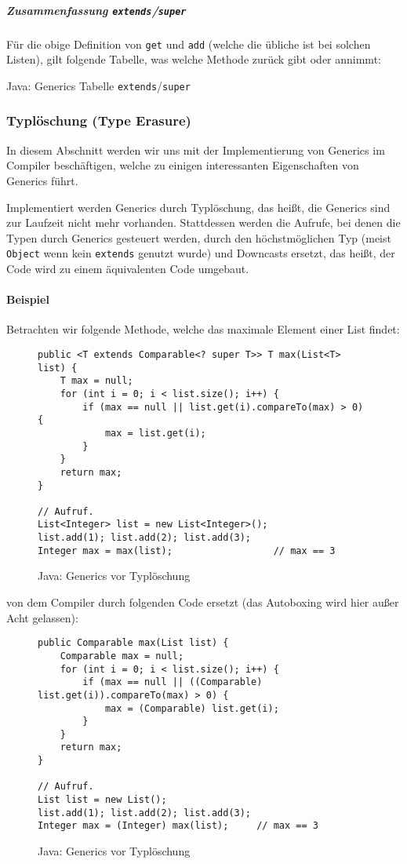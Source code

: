 			\subparagraph{Zusammenfassung \texttt{extends}/\texttt{super}}
				Für die obige Definition von \texttt{get} und \texttt{add} (welche die übliche ist bei solchen Listen), gilt folgende Tabelle, was welche Methode zurück gibt oder annimmt:
				\begin{table}[H]
					\centering
					\caption{Java: Generics Tabelle \texttt{extends}/\texttt{super}}
				\end{table}
	
	\subsubsection{Typlöschung (Type Erasure)}
		In diesem Abschnitt werden wir uns mit der Implementierung von Generics im Compiler beschäftigen, welche zu einigen interessanten Eigenschaften von Generics führt.
		
		Implementiert werden Generics durch Typlöschung, das heißt, die Generics sind zur Laufzeit nicht mehr vorhanden. Stattdessen werden die Aufrufe, bei denen die Typen durch Generics gesteuert werden, durch den höchstmöglichen Typ (meist \texttt{Object} wenn kein \texttt{extends} genutzt wurde) und Downcasts ersetzt, das heißt, der Code wird zu einem äquivalenten Code umgebaut.
		
		\paragraph{Beispiel}
			Betrachten wir folgende Methode, welche das maximale Element einer List findet:
			\begin{figure}[H]
				\centering
				\begin{lstlisting}
public <T extends Comparable<? super T>> T max(List<T> list) {
	T max = null;
	for (int i = 0; i < list.size(); i++) {
		if (max == null || list.get(i).compareTo(max) > 0) {
			max = list.get(i);
		}
	}
	return max;
}

// Aufruf.
List<Integer> list = new List<Integer>();
list.add(1); list.add(2); list.add(3);
Integer max = max(list);                  // max == 3
				\end{lstlisting}
				\caption{Java: Generics vor Typlöschung}
			\end{figure}
			von dem Compiler durch folgenden Code ersetzt (das Autoboxing wird hier außer Acht gelassen):
			\begin{figure}[H]
				\centering
				\begin{lstlisting}
public Comparable max(List list) {
	Comparable max = null;
	for (int i = 0; i < list.size(); i++) {
		if (max == null || ((Comparable) list.get(i)).compareTo(max) > 0) {
			max = (Comparable) list.get(i);
		}
	}
	return max;
}

// Aufruf.
List list = new List();
list.add(1); list.add(2); list.add(3);
Integer max = (Integer) max(list);     // max == 3
				\end{lstlisting}
				\caption{Java: Generics vor Typlöschung}
			\end{figure}
	
